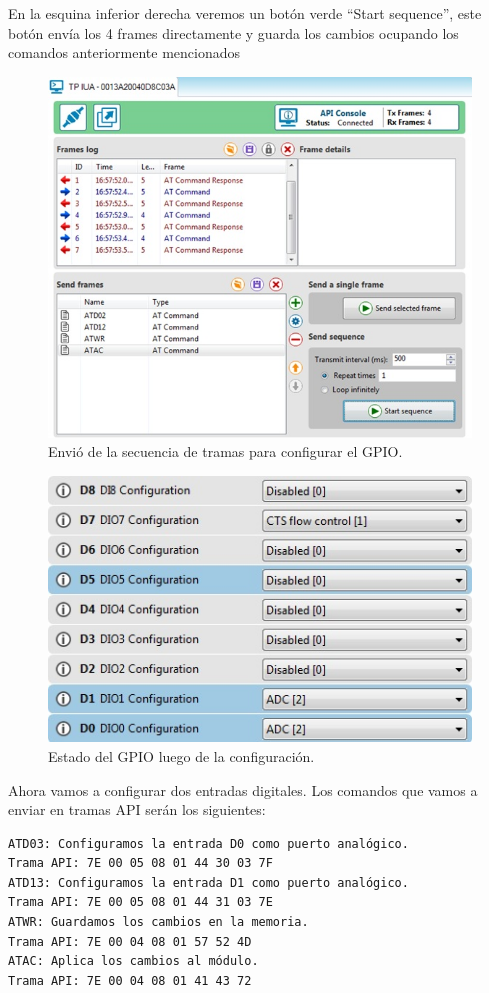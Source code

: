 \documentclass[11pt,oneside,spanish,a4paper]{article}
\begin{document}
En la esquina inferior derecha veremos un botón verde “Start sequence”, este botón envía los 4 frames directamente y guarda los cambios ocupando los comandos anteriormente mencionados
\begin{figure}[h]
	\centering
	\includegraphics[width=.6\textwidth]{img/IMAGEN16.jpg}
	\caption{Envió de la secuencia de tramas para configurar el GPIO.}
\end{figure}
\begin{figure}[h]
	\centering
	\includegraphics[width=.6\textwidth]{img/IMAGEN17.jpg}
	\caption{Estado del GPIO luego de la configuración.}
\end{figure}

Ahora vamos a configurar dos entradas digitales.
Los comandos que vamos a enviar en tramas API serán los siguientes:
\begin{lstlisting}[emph={ATD03:,Trama API:,ATD13:,ATWR:,ATAC:}, emphstyle={\color{green}}, label=code:apiEjempl-id]
ATD03: Configuramos la entrada D0 como puerto analógico.
Trama API: 7E 00 05 08 01 44 30 03 7F
ATD13: Configuramos la entrada D1 como puerto analógico.
Trama API: 7E 00 05 08 01 44 31 03 7E
ATWR: Guardamos los cambios en la memoria.
Trama API: 7E 00 04 08 01 57 52 4D
ATAC: Aplica los cambios al módulo.
Trama API: 7E 00 04 08 01 41 43 72
\end{lstlisting} 
\end{document}
